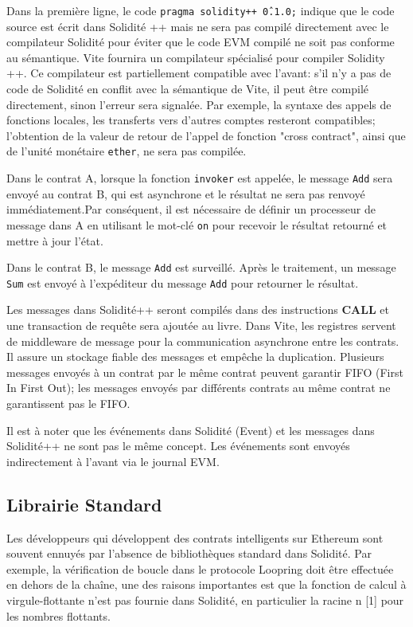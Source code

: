 \documentclass[UTF8,nofonts]{article}
\begin{document}
\begin{multicols}{2}
Dans la première ligne, le code \texttt{pragma solidity++ \^0.1.0;} indique que le code source est écrit dans Solidité ++ mais ne sera pas compilé directement avec le compilateur Solidité pour éviter que le code EVM compilé ne soit pas conforme au sémantique. Vite fournira un compilateur spécialisé pour compiler Solidity ++. Ce compilateur est partiellement compatible avec l'avant: s'il n'y a pas de code de Solidité en conflit avec la sémantique de Vite, il peut être compilé directement, sinon l'erreur sera signalée. Par exemple, la syntaxe des appels de fonctions locales, les transferts vers d'autres comptes resteront compatibles; l'obtention de la valeur de retour de l'appel de fonction "cross contract", ainsi que de l'unité monétaire \texttt{ether}, ne sera pas compilée.


Dans le contrat A, lorsque la fonction \texttt{invoker}  est appelée, le message \texttt{Add} sera envoyé au contrat B, qui est asynchrone et le résultat ne sera pas renvoyé immédiatement.Par conséquent, il est nécessaire de définir un processeur de message dans A en utilisant le mot-clé \texttt{on} pour recevoir le résultat retourné et mettre à jour l'état.


Dans le contrat B, le message \texttt{Add} est surveillé. Après le traitement, un message \texttt{Sum}  est envoyé à l'expéditeur du message \texttt{Add} pour retourner le résultat.

Les messages dans Solidité++ seront compilés dans des instructions \textbf{CALL} et une transaction de requête sera ajoutée au livre. Dans Vite, les registres servent de middleware de message pour la communication asynchrone entre les contrats. Il assure un stockage fiable des messages et empêche la duplication. Plusieurs messages envoyés à un contrat par le même contrat peuvent garantir FIFO (First In First Out); les messages envoyés par différents contrats au même contrat ne garantissent pas le FIFO.

Il est à noter que les événements dans Solidité (Event) et les messages dans Solidité++ ne sont pas le même concept. Les événements sont envoyés indirectement à l'avant via le journal EVM.


\subsection{Librairie Standard}
Les développeurs qui développent des contrats intelligents sur Ethereum sont souvent ennuyés par l'absence de bibliothèques standard dans Solidité. Par exemple, la vérification de boucle dans le protocole Loopring doit être effectuée en dehors de la chaîne, une des raisons importantes est que la fonction de calcul à virgule-flottante n'est pas fournie dans Solidité, en particulier la racine n [1]\cite{loopring} pour les nombres flottants.


\end{multicols}
\end{document}
